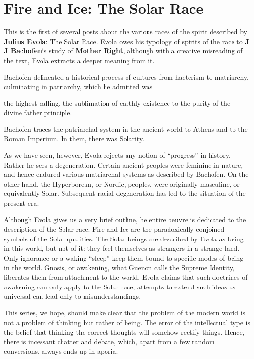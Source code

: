 \section{Fire and Ice: The Solar Race}

This is the first of several posts about the various races of the spirit described by \textbf{Julius Evola}: The Solar Race. Evola owes his typology of spirits of the race to \textbf{J J Bachofen}`s study of \textbf{Mother Right}, although with a creative misreading of the text, Evola extracts a deeper meaning from it.

Bachofen delineated a historical process of cultures from haeterism to matriarchy, culminating in patriarchy, which he admitted was

\begin{quotex}
the highest calling, the sublimation of earthly existence to the purity of the divine father principle.
\end{quotex}


Bachofen traces the patriarchal system in the ancient world to Athens and to the Roman Imperium. In them, there was Solarity.

As we have seen, however, Evola rejects any notion of ``progress'' in history. Rather he sees a degeneration. Certain ancient peoples were feminine in nature, and hence endured various matriarchal systems as described by Bachofen. On the other hand, the Hyperborean, or Nordic, peoples, were originally masculine, or equivalently Solar. Subsequent racial degeneration has led to the situation of the present era.

Although Evola gives us a very brief outline, he entire oeuvre is dedicated to the description of the Solar race. Fire and Ice are the paradoxically conjoined symbols of the Solar qualities. The Solar beings are described by Evola as being in this world, but not of it: they feel themselves as strangers in a strange land. Only ignorance or a waking ``sleep'' keep them bound to specific modes of being in the world. Gnosis, or awakening, what Guenon calls the Supreme Identity, liberates them from attachment to the world. Evola claims that such doctrines of awakening can only apply to the Solar race; attempts to extend such ideas as universal can lead only to misunderstandings.

This series, we hope, should make clear that the problem of the modern world is not a problem of thinking but rather of being. The error of the intellectual type is the belief that thinking the correct thoughts will somehow rectify things. Hence, there is incessant chatter and debate, which, apart from a few random conversions, always ends up in aporia.

